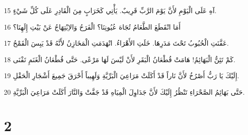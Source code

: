 \par 15 آهِ عَلَى الْيَوْمِ لأَنَّ يَوْمَ الرَّبِّ قَرِيبٌ. يَأْتِي كَخَرَابٍ مِنَ الْقَادِرِ عَلَى كُلِّ شَيْءٍ.
\par 16 أَمَا انْقَطَعَ الطَّعَامُ تُجَاهَ عُيُونِنَا؟ الْفَرَحُ وَالاِبْتِهَاجُ عَنْ بَيْتِ إِلَهِنَا؟
\par 17 عَفَّنَتِ الْحُبُوبُ تَحْتَ مَدَرِهَا. خَلَتِ الأَهْرَاءُ. انْهَدَمَتِ الْمَخَازِنُ لأَنَّهُ قَدْ يَبِسَ الْقَمْحُ.
\par 18 كَمْ تَئِنُّ الْبَهَائِمُ! هَامَتْ قُطْعَانُ الْبَقَرِ لأَنْ لَيْسَ لَهَا مَرْعًى. حَتَّى قُطْعَانُ الْغَنَمِ تَفْنَى.
\par 19 إِلَيْكَ يَا رَبُّ أَصْرُخُ لأَنَّ نَاراً قَدْ أَكَلَتْ مَرَاعِيَ الْبَرِّيَّةِ وَلَهِيباً أَحْرَقَ جَمِيعَ أَشْجَارِ الْحَقْلِ.
\par 20 حَتَّى بَهَائِمُ الصَّحْرَاءِ تَنْظُرُ إِلَيْكَ لأَنَّ جَدَاوِلَ الْمِيَاهِ قَدْ جَفَّتْ وَالنَّارَ أَكَلَتْ مَرَاعِيَ الْبَرِّيَّةِ.

\chapter{2}

